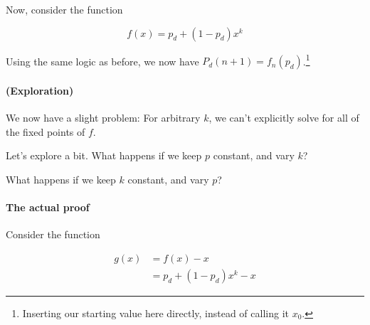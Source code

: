 Now, consider the function 

\begin{equation}
f(x) = p_d + (1 - p_d) x^k
\end{equation} 

Using the same logic as before, we now have $P_d(n+1) = f_n(p_d)$.\footnote{Inserting our starting value here directly, instead of calling it $x_0$.}

\paragraph{(Exploration)}

We now have a slight problem: For arbitrary $k$, we can't explicitly solve for all of the fixed points of $f$. %

Let's explore a bit. What happens if we keep $p$ constant, and vary $k$?


What happens if we keep $k$ constant, and vary $p$?


%


\paragraph{The actual proof}


Consider the function

\begin{align*}
g(x) &= f(x) - x \\
&= p_d + (1 - p_d)x^k - x
\end{align*}

